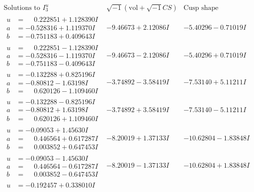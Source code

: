 \documentclass[1p]{elsarticle_modified}
\theoremstyle{definition}
\newcommand{\I}{\sqrt{-1}}
\begin{document}
$$\begin{array}{c|c|c}  
\text{Solutions to }I^u_{3}& \I (\text{vol} + \sqrt{-1}CS) & \text{Cusp shape}\\
 \hline 
\begin{aligned}
u &= \phantom{-}0.222851 + 1.128390 I \\
a &= -0.528316 + 1.119370 I \\
b &= -0.751183 + 0.409643 I\end{aligned}
 & -9.46673 + 2.12086 I & -5.40296 - 0.71019 I \\ \hline\begin{aligned}
u &= \phantom{-}0.222851 - 1.128390 I \\
a &= -0.528316 - 1.119370 I \\
b &= -0.751183 - 0.409643 I\end{aligned}
 & -9.46673 - 2.12086 I & -5.40296 + 0.71019 I \\ \hline\begin{aligned}
u &= -0.132288 + 0.825196 I \\
a &= -0.80812 - 1.63198 I \\
b &= \phantom{-}0.620126 - 1.109460 I\end{aligned}
 & -3.74892 - 3.58419 I & -7.53140 + 5.11211 I \\ \hline\begin{aligned}
u &= -0.132288 - 0.825196 I \\
a &= -0.80812 + 1.63198 I \\
b &= \phantom{-}0.620126 + 1.109460 I\end{aligned}
 & -3.74892 + 3.58419 I & -7.53140 - 5.11211 I \\ \hline\begin{aligned}
u &= -0.09053 + 1.45630 I \\
a &= \phantom{-}0.446564 + 0.617287 I \\
b &= \phantom{-}0.003852 + 0.647453 I\end{aligned}
 & -8.20019 + 1.37133 I & -10.62804 - 1.83848 I \\ \hline\begin{aligned}
u &= -0.09053 - 1.45630 I \\
a &= \phantom{-}0.446564 - 0.617287 I \\
b &= \phantom{-}0.003852 - 0.647453 I\end{aligned}
 & -8.20019 - 1.37133 I & -10.62804 + 1.83848 I \\ \hline\begin{aligned}
u &= -0.192457 + 0.338010 I \\

\end{aligned}
\end{array}$$
\end{document}
